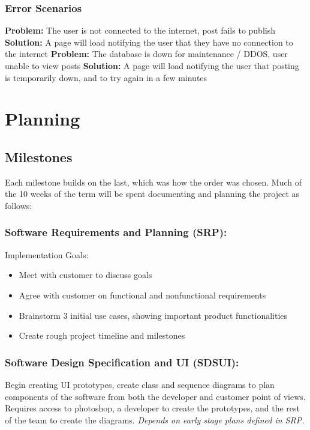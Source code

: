 \documentclass[12pt]{article}
\begin{document}
  \subsubsection{Error Scenarios}
  \textbf{Problem:}
  The user is not connected to the internet, post fails to publish
  \textbf{Solution:}
    A page will load notifying the user that they have no connection to the internet
  \textbf{Problem:}
  The database is down for maintenance / DDOS, user unable to view posts
  \textbf{Solution:}
    A page will load notifying the user that posting is temporarily down, and to try again in a few minutes

\section{Planning}
\subsection{Milestones}
Each milestone builds on the last, which was how the order was chosen.
Much of the 10 weeks of the term will be spent documenting and planning the project as follows:

\subsubsection{Software Requirements and Planning (SRP):}
Implementation Goals:
\begin{itemize}
  \item Meet with customer to discuss goals
  \item Agree with customer on functional and nonfunctional requirements
  \item Brainstorm 3 initial use cases, showing important product functionalities
  \item Create rough project timeline and milestones
\end{itemize}

\subsubsection{Software Design Specification and UI (SDSUI):}
Begin creating UI prototypes, create class and sequence diagrams to plan
components of the software from both the developer and customer point of views.
Requires access to photoshop, a developer to create the prototypes, and the rest
of the team to create the diagrams. \textit{Depends on early stage plans defined in SRP.}
\end{document}
